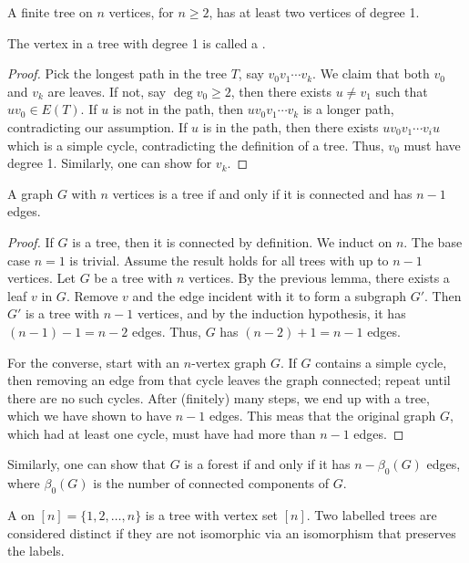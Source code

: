 \begin{lemma}
    A finite tree on $n$ vertices, for $n \geq 2$, has at least two vertices of degree 1.
\end{lemma}
The vertex in a tree with degree 1 is called a .
\begin{proof}
    Pick the longest path in the tree $T$, say $v_{0}v_{1}\cdots v_{k}$. We claim that both $v_{0}$ and $v_{k}$ are leaves. If not, say $\deg v_{0} \geq 2$, then there exists $u \neq v_{1}$ such that $uv_{0} \in E(T)$. If $u$ is not in the path, then $uv_{0}v_{1}\cdots v_{k}$ is a longer path, contradicting our assumption. If $u$ is in the path, then there exists $uv_{0}v_{1}\cdots v_{i}u$ which is a simple cycle, contradicting the definition of a tree. Thus, $v_{0}$ must have degree 1. Similarly, one can show for $v_{k}$.
\end{proof}

\begin{lemma}
    A graph $G$ with $n$ vertices is a tree if and only if it is connected and has $n-1$ edges.
\end{lemma}
\begin{proof}
    If $G$ is a tree, then it is connected by definition. We induct on $n$. The base case $n = 1$ is trivial. Assume the result holds for all trees with up to $n-1$ vertices. Let $G$ be a tree with $n$ vertices. By the previous lemma, there exists a leaf $v$ in $G$. Remove $v$ and the edge incident with it to form a subgraph $G'$. Then $G'$ is a tree with $n-1$ vertices, and by the induction hypothesis, it has $(n-1)-1 = n-2$ edges. Thus, $G$ has $(n-2)+1 = n-1$ edges.

    For the converse, start with an $n$-vertex graph $G$. If $G$ contains a simple cycle, then removing an edge from that cycle leaves the graph connected; repeat until there are no such cycles. After (finitely) many steps, we end up with a tree, which we have shown to have $n-1$ edges. This meas that the original graph $G$, which had at least one cycle, must have had more than $n-1$ edges. 
\end{proof}

Similarly, one can show that $G$ is a forest if and only if it has $n-\beta_{0}(G)$ edges, where $\beta_{0}(G)$ is the number of connected components of $G$.

\begin{definition}
    A  on $[n] = \{1,2,\ldots,n\}$ is a tree with vertex set $[n]$. Two labelled trees are considered distinct if they are not isomorphic via an isomorphism that preserves the labels.
\end{definition}

